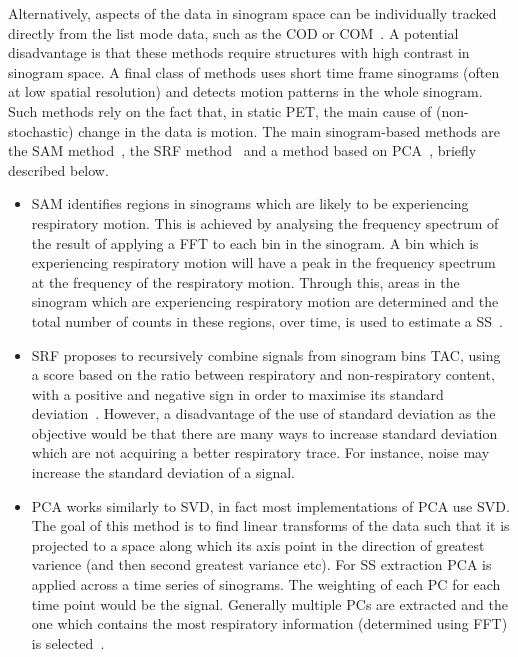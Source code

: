             Alternatively, aspects of the data in sinogram space can be individually tracked directly from the list mode data, such as the \gls{COD} or \gls{COM}~\parencite{Klein2001Fine-scaleInformation, Bruyant2002CorrectionPhantom, Ren2017Data-drivenDistribution, Feng2018Self-gating:PET}. A potential disadvantage is that these methods require structures with high contrast in sinogram space. A final class of methods uses short time frame sinograms (often at low spatial resolution) and detects motion patterns in the whole sinogram. Such methods rely on the fact that, in static \gls{PET}, the main cause of (non-stochastic) change in the data is motion. The main sinogram-based methods are the \gls{SAM} method~\parencite{Schleyer2009, Schleyer2011, Schleyer2018Data-DrivenMotion}, the \gls{SRF} method~\parencite{Kesner2010AMethods} and a method based on \gls{PCA}~\parencite{Thielemans2011, Bertolli2018Data-DrivenTomography}, briefly described below.

            \begin{itemize}
                \item \gls{SAM} identifies regions in sinograms which are likely to be experiencing respiratory motion. This is achieved by analysing the frequency spectrum of the result of applying a \gls{FFT} to each bin in the sinogram. A bin which is experiencing respiratory motion will have a peak in the frequency spectrum at the frequency of the respiratory motion. Through this, areas in the sinogram which are experiencing respiratory motion are determined and the total number of counts in these regions, over time, is used to estimate a \gls{SS}~\parencite{Schleyer2009, Schleyer2011, Schleyer2018Data-DrivenMotion}.
        
                \item \gls{SRF} proposes to recursively combine signals from sinogram bins \gls{TAC}, using a score based on the ratio between respiratory and non-respiratory content, with a positive and negative sign in order to maximise its standard deviation~\parencite{Kesner2010AMethods}. However, a disadvantage of the use of standard deviation as the objective would be that there are many ways to increase standard deviation which are not acquiring a better respiratory trace. For instance, noise may increase the standard deviation of a signal.
        
                \item \gls{PCA} works similarly to \gls{SVD}, in fact most implementations of \gls{PCA} use \gls{SVD}. The goal of this method is to find linear transforms of the data such that it is projected to a space along which its axis point in the direction of greatest varience (and then second greatest variance etc). For \gls{SS} extraction \gls{PCA} is applied across a time series of sinograms. The weighting of each \gls{PC} for each time point would be the signal. Generally multiple \glspl{PC} are extracted and the one which contains the most respiratory information (determined using \gls{FFT}) is selected~\parencite{Thielemans2011, Bertolli2018Data-DrivenTomography}.
            \end{itemize}
            
